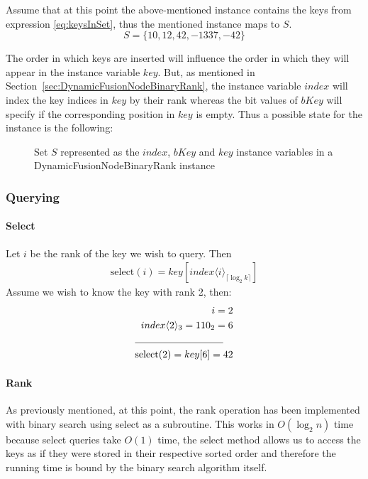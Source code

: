 Assume that at this point the above-mentioned instance contains the keys from expression \ref{eq:keysInSet}, thus the mentioned instance maps to $S$.
\begin{equation} \label{eq:keysInSet}
    S = \{10, 12, 42, -1337, -42 \}
\end{equation}

The order in which keys are inserted will influence the order in which they will appear in the instance variable $key$. But, as mentioned in Section~\ref{sec:DynamicFusionNodeBinaryRank}, the instance variable $index$ will index the key indices in $key$ by their rank whereas the bit values of $bKey$ will specify if the corresponding position in $key$ is empty. Thus a possible state for the instance is the following:

\begin{figure}[H]
\centering

\caption[Set $S$ represented by the state of the instance variables]{Set $S$ represented as the $index$, $bKey$ and $key$ instance variables in a {\ttfamily DynamicFusionNodeBinaryRank} instance}
\label{fig:stateOfTheInstance}
\end{figure}

\subsubsection{Querying}

\paragraph{Select}
Let $i$ be the rank of the key we wish to query. Then
\begin{align*}
\text{select}(i) = key[ index\langle i\rangle_{\lceil \log_2 k \rceil}]
\end{align*}
Assume we wish to know the key with rank 2, then:
\begin{align*}
    i = 2 \\
    index\langle 2\rangle_3 = 110_2 = 6 \\
    \cline{1-2}
    \text{select}(2) = key[6] = 42
\end{align*}

\paragraph{Rank}
As previously mentioned, at this point, the rank operation has been implemented with binary search using select as a subroutine. This works in $O(\log_2 n)$ time because select queries take $O(1)$ time, the select method allows us to access the keys as if they were stored in their respective sorted order and therefore the running time is bound by the binary search algorithm itself.

